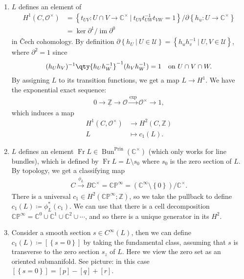 \begin{remark}
\begin{enumerate}
\def\labelenumi{\arabic{enumi}.}
\item
  \(L\) defines an element of
  \begin{align*}
  H^1(C, {\mathcal{O}}^{\times}) 
  &= \left\{{ t_{UV}: U \cap V \to {\mathbb{C}}^{\times}{~\mathrel{\Big|}~}t_{UV} t_{UW}^{-1}t_{VW} = 1 }\right\} / {{\partial}}\left\{{ h_u: U\to {\mathbb{C}}^{\times}}\right\} \\
  &= \ker {{\partial}}^1 / \operatorname{im}{{\partial}}^0
  \end{align*}
  in Čech cohomology. By definition
  \({{\partial}}\left\{{ h_U {~\mathrel{\Big|}~}U\in \mathcal{U} }\right\} = \left\{{ h_u h_v^{-1}{~\mathrel{\Big|}~}U, V \in \mathcal{U} }\right\}\),
  where \({{\partial}}^2 = 1\) since
  \begin{align*} 
    (h_U h_V)^{-1}\qty{h_U h_W ^{-1}}^{-1}(h_V h_W ^{-1}) = 1 && \text{on } U \cap V \cap W 
    .\end{align*}
  By assigning \(L\) to its transition functions, we get a map
  \(L\to H^1\). We have the exponential exact sequence:
  \begin{align*}
    0 \to \underline{{\mathbb{Z}}} \to {\mathcal{O}}\xrightarrow{\exp} {\mathcal{O}}^{\times}\to 1
    ,\end{align*}
  which induces a map
  \begin{align*}
    H^1(C, {\mathcal{O}}^{\times}) &\to H^2(C, {\mathbb{Z}}) \\
    L &\mapsto c_1(L)
    .\end{align*}
\item
  \(L\) defines an element
  \({\operatorname{Fr}}L \in \mathop{\mathrm{Bun}}^{\operatorname{Prin}}({\mathbb{C}}^{\times})\)
  (which only works for line bundles), which is defined by
  \({\operatorname{Fr}}L = L \setminus s_0\) where \(s_0\) is the zero
  section of \(L\). By topology, we get a classifying map
  \begin{align*}
  C \xrightarrow{\phi_L}  B{\mathbb{C}}^{\times}= {\mathbb{CP}}^\infty = ({\mathbb{C}}^{\infty} \setminus\left\{{0}\right\}) / {\mathbb{C}}^{\times}
    .\end{align*}
  There is a universal
  \(c_1\in H^2({\mathbb{CP}}^{\infty}; {\mathbb{Z}})\), so we take the
  pullback to define \(c_1(L) \coloneqq\phi_L^*(c_1)\). We can use that
  there is a cell decomposition
  \({\mathbb{CP}}^{\infty } = {\mathbb{C}}^0 \cup{\mathbb{C}}^1 \cup{\mathbb{C}}^2 \cup\cdots\),
  and so there is a unique generator in its \(H^2\).
\item
  Consider a smooth section \(s\in C^{\infty }(L)\), then we can define
  \(c_1(L) \coloneqq[ \left\{{ s = 0 }\right\} ]\) by taking the
  fundamental class, assuming that \(s\) is transverse to the zero
  section \(s_z\) of \(L\). Here we view the zero set as an oriented
  submanifold. See picture: in this case
  \([\left\{{ s = 0 }\right\} ] = [p] - [q] + [r]\).
\end{enumerate}


\end{remark}


